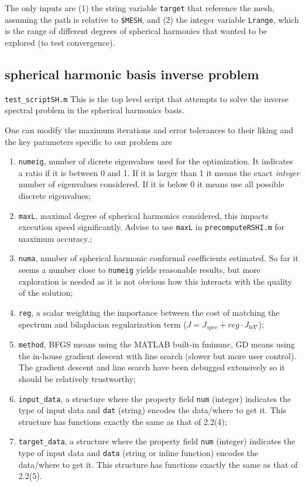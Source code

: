 \documentclass[11pt]{article}
\theoremstyle{definition}
\begin{document}
The only inputs are (1) the string variable \verb|target| that reference the mesh, assuming the path is relative to \verb|$MESH|, and (2) the integer variable \verb|Lrange|, which is the range of different degrees of spherical harmonics that wanted to be explored (to test convergence). 

\subsection{spherical harmonic basis inverse problem}
\verb|test_scriptSH.m|
This is the top level script that attempts to solve the inverse spectral problem in the spherical harmonics basis. 

One can modify the maximum iterations and error tolerances to their liking and the key parameters specific to our problem are
\begin{enumerate}
	\item \verb|numeig|, number of dicrete eigenvalues used for the optimization. It indicates a ratio if it is between 0 and 1. If it is larger than 1 it means the exact \textit{integer} number of eigenvalues considered. If it is below 0 it means use all possible discrete eigenvalues;
	
	\item \verb|maxL|, maximal degree of spherical harmonics considered, this impacts execution speed significantly. Advise to use \verb|maxL| in \verb|precomputeRSHI.m| for maximum accuracy.;
	
	\item \verb|numa|, number of spherical harmonic conformal coefficients estimated. So far it seems a number close to \verb|numeig| yields reasonable results, but more exploration is needed as it is not obvious how this interacts with the quality of the solution;
	
	\item \verb|reg|, a scalar weighting the importance between the cost of matching the spectrum and bilaplacian regularization term ($J = J_{spec}+ reg \cdot J_{bi\nabla}$);
	
	\item \verb|method|, BFGS means using the MATLAB built-in fminunc, GD means using the in-house gradient descent with line search (slower but more user control). The gradient descent and line search have been debugged extensively so it should be relatively trustworthy;
	
	\item \verb|input_data|, a structure where the property field \verb|num| (integer) indicates the type of input data and \verb|dat| (string) encodes the data/where to get it. This structure has functions exactly the same as that of 2.2(4);
	
	\item \verb|target_data|, a structure where the property field \verb|num| (integer) indicates the type of input data and \verb|data| (string or inline function) encodes the data/where to get it. This structure has functions exactly the same as that of 2.2(5).
\end{enumerate}
\end{document}
